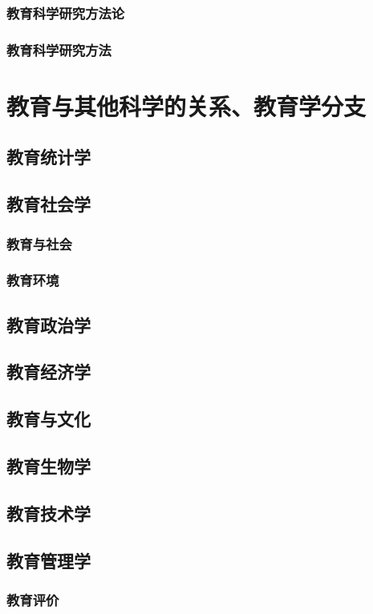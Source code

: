 \documentclass[UTF8]{../../ApplicationUniverse}
\begin{document}
    \subsubsection{教育科学研究方法论}
    \subsubsection{教育科学研究方法}

\section{教育与其他科学的关系、教育学分支}
    \subsection{教育统计学}
    \subsection{教育社会学}
        \subsubsection{教育与社会}
        \subsubsection{教育环境}
    \subsection{教育政治学}
    \subsection{教育经济学}
    \subsection{教育与文化}
    \subsection{教育生物学}
    \subsection{教育技术学}
    \subsection{教育管理学}
        \subsubsection{教育评价}
\end{document}
